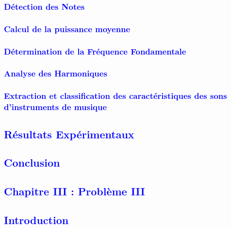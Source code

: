 \documentclass{article}
\numberwithin{equation}{section}
\begin{document}
\newpage
\textcolor{blue}{\subsubsection{Détection des Notes}}

\textcolor{blue}{\subsubsection{Calcul de la puissance moyenne}}

\textcolor{blue}{\subsubsection{Détermination de la Fréquence Fondamentale}}

\textcolor{blue}{\subsubsection{Analyse des Harmoniques}}

\textcolor{blue}{\subsubsection{Extraction et classification des caractéristiques des sons d'instruments de musique}}

\textcolor{blue}{\subsection{Résultats Expérimentaux}}

\textcolor{blue}{\subsection{Conclusion}}

\newpage
\textcolor{blue}{\section{Chapitre III : Problème III}}
\textcolor{blue}{\subsection{Introduction}}

\end{document}
